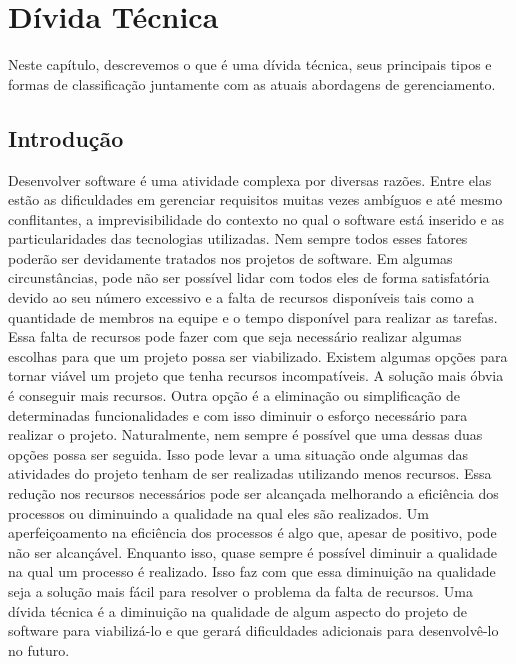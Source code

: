 \chapter{Dívida Técnica}
\label{cap:cap2}

Neste capítulo, descrevemos o que é uma dívida técnica, seus principais tipos e formas de classificação juntamente com as atuais abordagens de gerenciamento.


\section{Introdução}


Desenvolver software é uma atividade complexa por diversas razões. Entre elas estão as dificuldades em gerenciar requisitos muitas vezes ambíguos e até mesmo conflitantes, a imprevisibilidade do contexto no qual o software está inserido e as particularidades das tecnologias utilizadas. Nem sempre todos esses fatores poderão ser devidamente tratados nos projetos de software. Em algumas circunstâncias, pode não ser possível lidar com todos eles de forma satisfatória devido ao seu número excessivo e a falta de recursos disponíveis tais como a quantidade de membros na equipe e o tempo disponível para realizar as tarefas. Essa falta de recursos pode fazer com que seja necessário realizar algumas escolhas para que um projeto possa ser viabilizado. Existem algumas opções para tornar viável um projeto que tenha recursos incompatíveis.  A solução mais óbvia é conseguir mais recursos. Outra opção é a eliminação ou simplificação  de determinadas funcionalidades e com isso diminuir o esforço necessário para realizar o projeto.   Naturalmente, nem sempre é possível que uma dessas duas opções possa ser seguida. Isso pode levar a uma situação onde algumas das atividades do projeto tenham de ser realizadas utilizando menos recursos. Essa redução nos recursos necessários pode ser alcançada melhorando a eficiência dos processos ou diminuindo a qualidade na qual eles são realizados. Um aperfeiçoamento na eficiência dos processos é algo que, apesar de positivo, pode não ser alcançável. Enquanto isso, quase sempre é possível diminuir a qualidade na qual um processo é realizado. Isso faz com que essa diminuição na qualidade seja a solução mais fácil para resolver o problema da falta de recursos. Uma dívida técnica é a diminuição na qualidade de algum aspecto do projeto de software para viabilizá-lo e que gerará dificuldades adicionais para  desenvolvê-lo no futuro.

